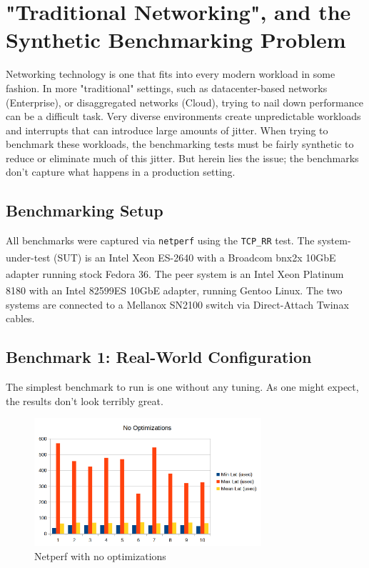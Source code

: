 \documentclass[letterpaper]{article}
\begin{document}
\section{"Traditional Networking", and the Synthetic Benchmarking Problem}
Networking technology is one that fits into every modern workload in some fashion. In more "traditional" settings, such as datacenter-based networks (Enterprise), or disaggregated networks (Cloud), trying to nail down performance can be a difficult task. Very diverse environments create unpredictable workloads and interrupts that can introduce large amounts of jitter. When trying to benchmark these workloads, the benchmarking tests must be fairly synthetic to reduce or eliminate much of this jitter. But herein lies the issue; the benchmarks don't capture what happens in a production setting.
\subsection{Benchmarking Setup}
All benchmarks were captured via \texttt{netperf} using the \texttt{TCP\_RR} test. The system-under-test (SUT) is an Intel\textsuperscript{\textregistered} Xeon\textsuperscript{\textregistered} ES-2640 with a Broadcom bnx2x 10GbE adapter running stock Fedora 36.  The peer system is an Intel\textsuperscript{\textregistered} Xeon\textsuperscript{\textregistered} Platinum 8180 with an Intel\textsuperscript{\textregistered} 82599ES 10GbE adapter, running Gentoo Linux.  The two systems are connected to a Mellanox SN2100 switch via Direct-Attach Twinax cables.
\subsection{Benchmark 1: Real-World Configuration}
The simplest benchmark to run is one without any tuning.  As one might expect, the results don't look terribly great.
\newline

\begin{figure}[h]
\includegraphics[width=3.31in]{netperf-no-opt.png}
\caption{Netperf with no optimizations}
\label{netperf-no-opt}
\end{figure}
\end{document}
